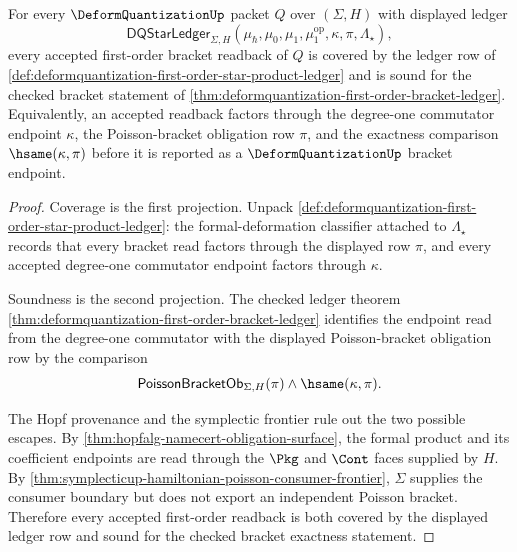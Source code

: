 \begin{theorem}
\label{thm:deformquantization-first-order-ledger-exactness-obligation}
For every $\DeformQuantizationUp$ packet $Q$ over $(\Sigma,H)$ with displayed ledger
$$
\mathsf{DQStarLedger}_{\Sigma,H}(\mu_\hbar,\mu_0,\mu_1,\mu_1^{\mathrm{op}},\kappa,\pi,\Lambda_\star),
$$
every accepted first-order bracket readback of $Q$ is covered by the ledger row of \autoref{def:deformquantization-first-order-star-product-ledger} and is sound for the checked bracket statement of \autoref{thm:deformquantization-first-order-bracket-ledger}. Equivalently, an accepted readback factors through the degree-one commutator endpoint $\kappa$, the Poisson-bracket obligation row $\pi$, and the exactness comparison $\hsame(\kappa,\pi)$ before it is reported as a $\DeformQuantizationUp$ bracket endpoint.
\end{theorem}
\begin{proof}
Coverage is the first projection. Unpack \autoref{def:deformquantization-first-order-star-product-ledger}: the formal-deformation classifier attached to $\Lambda_\star$ records that every bracket read factors through the displayed row $\pi$, and every accepted degree-one commutator endpoint factors through $\kappa$.

Soundness is the second projection. The checked ledger theorem \autoref{thm:deformquantization-first-order-bracket-ledger} identifies the endpoint read from the degree-one commutator with the displayed Poisson-bracket obligation row by the comparison
$$
\mathsf{PoissonBracketOb}_{\Sigma,H}(\pi)\land\hsame(\kappa,\pi).
$$

The Hopf provenance and the symplectic frontier rule out the two possible escapes. By \autoref{thm:hopfalg-namecert-obligation-surface}, the formal product and its coefficient endpoints are read through the $\Pkg$ and $\Cont$ faces supplied by $H$. By \autoref{thm:symplecticup-hamiltonian-poisson-consumer-frontier}, $\Sigma$ supplies the consumer boundary but does not export an independent Poisson bracket. Therefore every accepted first-order readback is both covered by the displayed ledger row and sound for the checked bracket exactness statement.
\end{proof}

